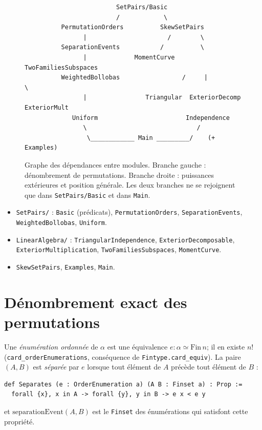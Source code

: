 \documentclass[11pt]{article}
\begin{document}
\begin{figure}[t]
\centering
\begin{verbatim}
                         SetPairs/Basic
                         /            \
          PermutationOrders          SkewSetPairs
                |                      /        \
          SeparationEvents           /          \
                |             MomentCurve   TwoFamiliesSubspaces
          WeightedBollobas                 /     |         \
                |                Triangular  ExteriorDecomp  ExteriorMult
             Uniform                        Independence
                \                              /
                 \____________ Main _________/    (+ Examples)
\end{verbatim}
\caption{Graphe des dépendances entre modules. Branche gauche : dénombrement de
permutations. Branche droite : puissances extérieures et position générale. Les deux
branches ne se rejoignent que dans \texttt{SetPairs/Basic} et dans \texttt{Main}.}
\label{fig:dep}
\end{figure}

\begin{itemize}
\item \texttt{SetPairs/} : \texttt{Basic} (prédicats), \texttt{PermutationOrders},
  \texttt{SeparationEvents}, \texttt{WeightedBollobas}, \texttt{Uniform}.
\item \texttt{LinearAlgebra/} : \texttt{TriangularIndependence},
  \texttt{ExteriorDecomposable}, \texttt{ExteriorMultiplication},
  \texttt{TwoFamiliesSubspaces}, \texttt{MomentCurve}.
\item \texttt{SkewSetPairs}, \texttt{Examples}, \texttt{Main}.
\end{itemize}

\section{Dénombrement exact des permutations}\label{sec:count}

Une \emph{énumération ordonnée} de $\alpha$ est une équivalence
$e:\alpha\simeq\mathrm{Fin}\,n$; il en existe $n!$
(\lstinline{card_orderEnumerations}, conséquence de
\lstinline{Fintype.card_equiv}). La paire $(A,B)$ est \emph{séparée} par $e$ lorsque
tout élément de $A$ précède tout élément de $B$ :
\begin{verbatim}
def Separates (e : OrderEnumeration a) (A B : Finset a) : Prop :=
  forall {x}, x in A -> forall {y}, y in B -> e x < e y
\end{verbatim}
et $\mathrm{separationEvent}(A,B)$ est le \texttt{Finset} des énumérations qui
satisfont cette propriété.
\end{document}
